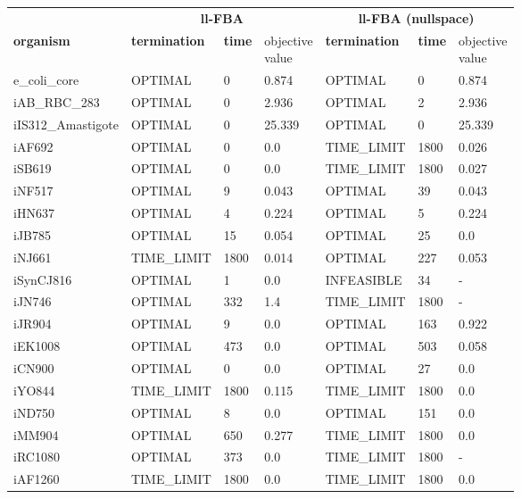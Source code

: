 \begin{table}[!ht]
    \small
    \centering
    \begin{tabular}{@{\extracolsep{4pt}}lllllll@{}}
    \hline
        \multicolumn{1}{c}{} & \multicolumn{3}{c}{\textbf{ll-FBA}} & \multicolumn{3}{c}{\textbf{ll-FBA (nullspace)}}\\ \cline{2-4} \cline{5-7} 
        \textbf{organism} & \textbf{termination} & \textbf{time} & \thead{objective \\value} & \textbf{termination} & \textbf{time} & \thead{objective \\value} \\ \hline
        e\_coli\_core & OPTIMAL & 0 & 0.874 & OPTIMAL & 0 & 0.874 \\
        iAB\_RBC\_283 & OPTIMAL & 0 & 2.936 & OPTIMAL & 2 & 2.936 \\
        iIS312\_Amastigote & OPTIMAL & 0 & 25.339 & OPTIMAL & 0 & 25.339 \\
        iAF692 & OPTIMAL & 0 & 0.0 & TIME\_LIMIT & 1800 & 0.026 \\
        iSB619 & OPTIMAL & 0 & 0.0 & TIME\_LIMIT & 1800 & 0.027 \\
        iNF517 & OPTIMAL & 9 & 0.043 & OPTIMAL & 39 & 0.043 \\
        iHN637 & OPTIMAL & 4 & 0.224 & OPTIMAL & 5 & 0.224 \\
        iJB785 & OPTIMAL & 15 & 0.054 & OPTIMAL & 25 & 0.0 \\
        iNJ661 & TIME\_LIMIT & 1800 & 0.014 & OPTIMAL & 227 & 0.053 \\ 
        iSynCJ816 & OPTIMAL & 1 & 0.0 & INFEASIBLE & 34 & - \\
        iJN746 & OPTIMAL & 332 & 1.4 & TIME\_LIMIT & 1800 & - \\
        iJR904 & OPTIMAL & 9 & 0.0 & OPTIMAL & 163 & 0.922 \\
        iEK1008 & OPTIMAL & 473 & 0.0 & OPTIMAL & 503 & 0.058 \\
        iCN900 & OPTIMAL & 0 & 0.0 & OPTIMAL & 27 & 0.0 \\
        iYO844 & TIME\_LIMIT & 1800 & 0.115 & TIME\_LIMIT & 1800 & 0.0 \\
        iND750 & OPTIMAL & 8 & 0.0 & OPTIMAL & 151 & 0.0 \\
        iMM904 & OPTIMAL & 650 & 0.277 & TIME\_LIMIT & 1800 & 0.0 \\
        iRC1080 & OPTIMAL & 373 & 0.0 & TIME\_LIMIT & 1800 & - \\
        iAF1260 & TIME\_LIMIT & 1800 & 0.0 & TIME\_LIMIT & 1800 & 0.0 \\

\end{tabular}
\end{table}
